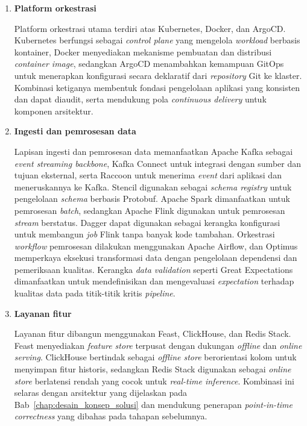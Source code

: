 \begin{enumerate}
    \item \textbf{Platform orkestrasi}
    
    Platform orkestrasi utama terdiri atas Kubernetes, Docker, dan ArgoCD. Kubernetes berfungsi sebagai \textit{control plane} yang mengelola \textit{workload} berbasis kontainer, Docker menyediakan mekanisme pembuatan dan distribusi \textit{container image}, sedangkan ArgoCD menambahkan kemampuan GitOps untuk menerapkan konfigurasi secara deklaratif dari \textit{repository} Git ke klaster. Kombinasi ketiganya membentuk fondasi pengelolaan aplikasi yang konsisten dan dapat diaudit, serta mendukung pola \textit{continuous delivery} untuk komponen arsitektur.
    
    \vspace{0.5em}
    
    \item \textbf{Ingesti dan pemrosesan data}
    
    Lapisan ingesti dan pemrosesan data memanfaatkan Apache Kafka sebagai \textit{event streaming backbone}, Kafka Connect untuk integrasi dengan sumber dan tujuan eksternal, serta Raccoon untuk menerima \textit{event} dari aplikasi dan meneruskannya ke Kafka. Stencil digunakan sebagai \textit{schema registry} untuk pengelolaan \textit{schema} berbasis Protobuf. Apache Spark dimanfaatkan untuk pemrosesan \textit{batch}, sedangkan Apache Flink digunakan untuk pemrosesan \textit{stream} berstatus. Dagger dapat digunakan sebagai kerangka konfigurasi untuk membangun \textit{job} Flink tanpa banyak kode tambahan. Orkestrasi \textit{workflow} pemrosesan dilakukan menggunakan Apache Airflow, dan Optimus memperkaya eksekusi transformasi data dengan pengelolaan dependensi dan pemeriksaan kualitas. Kerangka \textit{data validation} seperti Great Expectations dimanfaatkan untuk mendefinisikan dan mengevaluasi \textit{expectation} terhadap kualitas data pada titik-titik kritis \textit{pipeline}.
    
    \vspace{0.5em}
    
    \item \textbf{Layanan fitur}
    
    Layanan fitur dibangun menggunakan Feast, ClickHouse, dan Redis Stack. Feast menyediakan \textit{feature store} terpusat dengan dukungan \textit{offline} dan \textit{online serving}. ClickHouse bertindak sebagai \textit{offline store} berorientasi kolom untuk menyimpan fitur historis, sedangkan Redis Stack digunakan sebagai \textit{online store} berlatensi rendah yang cocok untuk \textit{real-time inference}. Kombinasi ini selaras dengan arsitektur yang dijelaskan pada Bab~\ref{chap:desain_konsep_solusi} dan mendukung penerapan \textit{point-in-time correctness} yang dibahas pada tahapan sebelumnya.
    

\end{enumerate}
